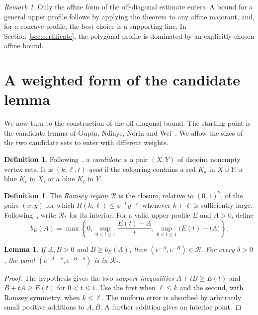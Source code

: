 \documentclass[11pt]{article}
\newtheorem{lemma}[theorem]{Lemma}
\theoremstyle{definition}
\newtheorem{definition}[theorem]{Definition}
\theoremstyle{remark}
\newtheorem{remark}[theorem]{Remark}
\newcommand{\RR}{\mathcal R}
\newcommand{\bb}{b}
\numberwithin{equation}{section}
\begin{document}
\begin{remark}\label{rem:local}
Only the affine form of the off-diagonal estimate enters. A bound for
a general upper profile follows by applying the theorem to any affine
majorant, and, for a concave profile, the best choice is a supporting
line. In Section~\ref{sec:certificate}, the polygonal
profile is dominated by an explicitly chosen affine bound.
\end{remark}

\section{A weighted form of the candidate lemma}\label{sec:weighted}

We now turn to the construction of the off-diagonal bound. The starting
point is the candidate lemma of Gupta, Ndiaye, Norin and Wei~\cite{GNNW}.
We allow the sizes of the two candidate sets to enter with different
weights.

\begin{definition}\label{def:candidate}
Following~\cite{GNNW}, a \emph{candidate} is a pair $(X,Y)$ of disjoint nonempty vertex sets. It is \emph{$(k,\ell,t)$-good} if the colouring contains a red $K_k$ in $X\cup Y$, a blue $K_t$ in $X$, or a blue $K_\ell$ in $Y$.
\end{definition}

\begin{definition}\label{def:region}
The \emph{Ramsey region} $\RR$ is the closure, relative to $(0,1)^2$,
of the pairs $(x,y)$ for which $R(k,\ell)\le x^{-k}y^{-\ell}$ whenever
$k+\ell$ is sufficiently large. Following~\cite{GNNW}, write $\RR_*$
for its interior. For a valid upper profile $E$ and $A>0$, define
\[
 \bb_E(A)=\max\left\{0,
 \sup_{0<t\le1}\frac{E(t)-A}{t},
 \sup_{0<t\le1}\bigl(E(t)-tA\bigr)\right\}.
\]
\end{definition}

\begin{lemma}\label{lem:support}
If $A,B>0$ and $B\ge\bb_E(A)$, then $(e^{-A},e^{-B})\in\RR$. For every $\delta>0$, the point $(e^{-A-\delta},e^{-B-\delta})$ is in $\RR_*$.
\end{lemma}
\begin{proof}
The hypothesis gives the two \emph{support inequalities}
$A+tB\ge E(t)$ and $B+tA\ge E(t)$ for $0<t\le1$.
Use the first when $\ell\le k$ and the second, with Ramsey symmetry,
when $k\le\ell$. The uniform error is absorbed by arbitrarily small
positive additions to $A,B$. A further addition gives an interior point.
\end{proof}
\end{document}
